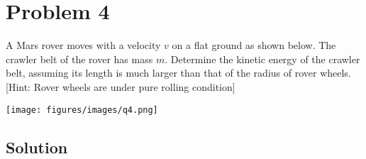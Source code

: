 \section*{Problem 4}

A Mars rover moves with a velocity \(v\) on a flat ground as shown below.
The crawler belt of the rover has mass \(m\).
Determine the kinetic energy of the crawler belt, assuming its length is much larger than that of the radius of rover wheels. [Hint: Rover wheels are under pure rolling condition]

\begin{figure*}[h]
    \centering
    \texttt{[image: figures/images/q4.png]}
\end{figure*}

\subsection*{Solution}
